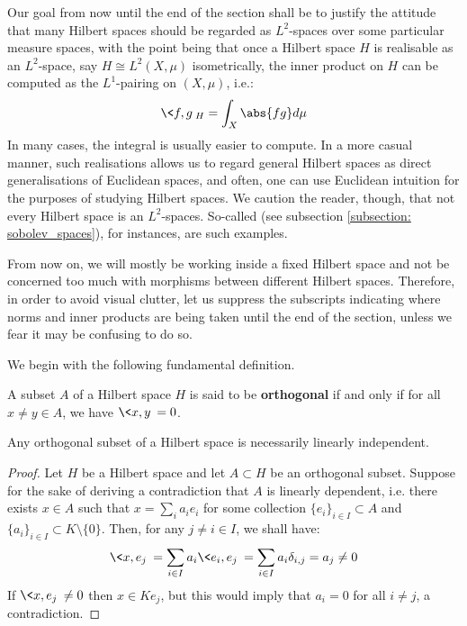         Our goal from now until the end of the section shall be to justify the attitude that many  Hilbert spaces should be regarded as $L^2$-spaces over some particular measure spaces, with the point being that once a Hilbert space $H$ is realisable as an $L^2$-space, say $H \cong L^2(X, \mu)$ isometrically, the inner product on $H$ can be computed as the $L^1$-pairing on $(X, \mu)$, i.e.:
            $$\<f, g\>_H = \int_X \abs{fg} d\mu$$
        In many cases, the integral is usually easier to compute. In a more casual manner, such realisations allows us to regard general Hilbert spaces as direct generalisations of Euclidean spaces, and often, one can use Euclidean intuition for the purposes of studying Hilbert spaces. We caution the reader, though, that not every Hilbert space is an $L^2$-spaces. So-called  (see subsection \ref{subsection: sobolev_spaces}), for instances, are such examples. 
        \begin{convention}
            From now on, we will mostly be working inside a fixed Hilbert space and not be concerned too much with morphisms between different Hilbert spaces. Therefore, in order to avoid visual clutter, let us suppress the subscripts indicating where norms and inner products are being taken until the end of the section, unless we fear it may be confusing to do so.
        \end{convention}
        We begin with the following fundamental definition.
        \begin{definition} \label{def: orthogonal_subsets}
            A subset $A$ of a Hilbert space $H$ is said to be \textbf{orthogonal} if and only if for all $x \not = y \in A$, we have $\<x, y\> = 0$.
        \end{definition}
        \begin{lemma} \label{lemma: orthogonal_subsets_linear_independence}
            Any orthogonal subset of a Hilbert space is necessarily linearly independent. 
        \end{lemma}
            \begin{proof}
                Let $H$ be a Hilbert space and let $A \subset H$ be an orthogonal subset. Suppose for the sake of deriving a contradiction that $A$ is linearly dependent, i.e. there exists $x \in A$ such that $x = \sum_i a_i e_i$ for some collection $\{e_i\}_{i \in I} \subset A$ and $\{a_i\}_{i \in I} \subset K \setminus \{0\}$. Then, for any $j \not = i \in I$, we shall have:
                    $$\<x, e_j\> = \sum_{i \in I} a_i \<e_i, e_j\> = \sum_{i \in I} a_i \delta_{i, j} = a_j \not = 0$$
                If $\<x, e_j\> \not = 0$ then $x \in K e_j$, but this would imply that $a_i = 0$ for all $i \not = j$, a contradiction.
            \end{proof}
